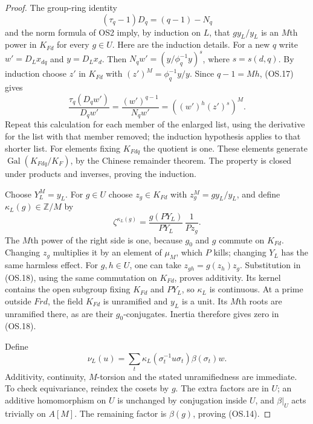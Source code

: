 \begin{proof}
The group-ring identity
\[
                 (\tau_q-1)D_q=(q-1)-N_q
 \tag{OS.17}
\]
and the norm formula of OS2 imply, by induction on $L$, that
$g y_L/y_L$ is an $M$th power in $K_{Fd}$ for every $g\in U$.
Here are the induction details.  For a new $q$ write
$w'=D_Lx_{dq}$ and $y=D_Lx_d$.  Then
$N_qw'=(y/\phi_q^{-1}y)^s$, where $s=s(d,q)$.
By induction choose $z'$ in $K_{Fd}$ with
$(z')^M=\phi_q^{-1}y/y$.  Since $q-1=Mh$, (OS.17) gives
\[
 \frac{\tau_q(D_qw')}{D_qw'}
          =\frac{(w')^{q-1}}{N_qw'}
          =((w')^h(z')^s)^M.
\]
Repeat this calculation for each member of the enlarged list, using
the derivative for the list with that member removed; the induction
hypothesis applies to that shorter list.  For elements fixing
$K_{Fdq}$ the quotient is one.
These elements generate $\operatorname{Gal}(K_{Fdq}/K_F)$, by the
Chinese remainder theorem.  The property is closed under products
and inverses, proving the induction.

Choose $Y_L^M=y_L$.  For $g\in U$ choose $z_g\in K_{Fd}$ with
$z_g^M=g y_L/y_L$, and define $\kappa_L(g)\in\mathbb Z/M$ by
\[
 \zeta^{\kappa_L(g)}=
       \frac{g(PY_L)}{PY_L}\,\frac1{Pz_g}.
 \tag{OS.18}
\]
The $M$th power of the right side is one, because $g_0$ and $g$
commute on $K_{Fd}$.  Changing $z_g$ multiplies it by an element of
$\mu_M$, which $P$ kills; changing $Y_L$ has the same harmless
effect.  For $g,h\in U$, one can take $z_{gh}=g(z_h)z_g$.
Substitution in (OS.18), using the same commutation on $K_{Fd}$,
proves additivity.  Its kernel contains the open subgroup fixing
$K_{Fd}$ and $PY_L$, so $\kappa_L$ is continuous.
At a prime outside $Frd$, the field $K_{Fd}$ is unramified and
$y_L$ is a unit.  Its $M$th roots are unramified there, as are their
$g_0$-conjugates.  Inertia therefore gives zero in (OS.18).

Define
\[
 \nu_L(u)=\sum_t\kappa_L(\sigma_t^{-1}u\sigma_t)
                              \beta(\sigma_t)w.
 \tag{OS.19}
\]
Additivity, continuity, $M$-torsion and the stated unramifiedness are
immediate.  To check equivariance, reindex the cosets by $g$.
The extra factors are in $U$; an additive homomorphism on $U$ is
unchanged by conjugation inside $U$, and $\beta|_U$ acts trivially
on $A[M]$.  The remaining factor is $\beta(g)$, proving (OS.14).


\end{proof}
